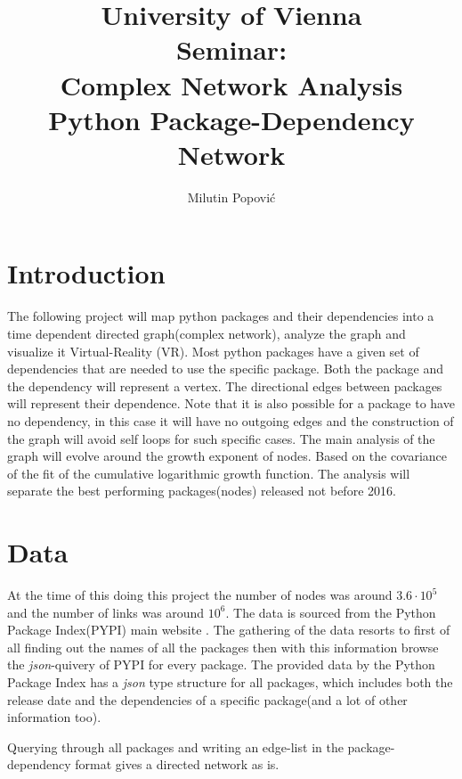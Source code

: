 \documentclass[a4paper]{article}
\title{University of Vienna\\
\vspace{1cm}Seminar:\\Complex Network Analysis\\
\vspace{0.5cm}Python Package-Dependency Network
}
\author{Milutin Popović}
\begin{document}
\maketitle

\section{Introduction}

The following project will map python packages and their dependencies into a
time dependent directed graph(complex network), analyze the graph and
visualize it Virtual-Reality (VR). Most python packages have a given set of
dependencies that are needed to use the specific package. Both the package
and the dependency will represent a vertex. The directional edges between
packages will represent their dependence. Note that it is also possible for a
package to have no dependency, in this case it will have no outgoing edges
and the construction of the graph will avoid self loops for such specific
cases. The main analysis of the graph will evolve around the growth exponent
of nodes. Based on the covariance of the fit of the cumulative logarithmic
growth function. The analysis will separate the best performing
packages(nodes) released not before 2016.

\section{Data}
At the time of this doing this project the number of nodes was around
$3.6\cdot10^{5}$ and the number of links was around $10^{6}$. The data is
sourced from the Python Package Index(PYPI) main website \cite{pypi}. The
gathering of the data resorts to first of all finding out the names of all
the packages then with this information browse the \textit{json}-quivery of
PYPI for every package. The provided data by the Python Package Index has a
\textit{json} type structure for all packages, which includes both the
release date and the dependencies of a specific package(and a lot of other
information too).


Querying through all packages
and writing an edge-list in the package-dependency format gives a directed
network as is.
\end{document}
